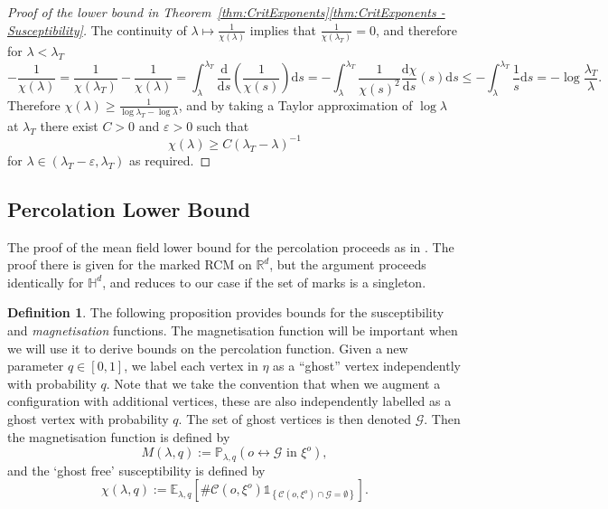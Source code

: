\documentclass[10pt,a4paper,dvipsnames]{article}
\theoremstyle{definition}
\newtheorem{definition}[theorem]{Definition}
\theoremstyle{remark}
\newcommand{\plaq}{\mathbb{P}_{\lambda,q}}
\newcommand{\elaq}{\mathbb E_{\lambda,q}}
\newcommand{\Rd}{\mathbb R^d}
\newcommand{\HypDim}{{\mathbb{H}^d}}
\newcommand{\dd}{\mathrm{d}} %
\newcommand{\C}{\mathscr {C}}
\newcommand{\Gcal}{\mathcal{G}}
\newcommand{\conn}[3]{#1 \longleftrightarrow #2\textrm { in } #3}
\newcommand{\Id}{\mathds 1}
\newcommand{\orig}{o}
\numberwithin{equation}{section}
\begin{document}
\begin{proof}[Proof of the lower bound in Theorem~\ref{thm:CritExponents}\ref{thm:CritExponents - Susceptibility}]
    The continuity of $\lambda\mapsto \frac{1}{\chi\left(\lambda\right)}$ implies that $\frac{1}{\chi\left(\lambda_T\right)}=0$, and therefore for $\lambda<\lambda_T$
    \begin{equation}
        -\frac{1}{\chi\left(\lambda\right)} = \frac{1}{\chi\left(\lambda_T\right)}-\frac{1}{\chi\left(\lambda\right)} = \int^{\lambda_T}_\lambda \frac{\dd}{\dd s}\left(\frac{1}{\chi(s)}\right)\dd s = -\int^{\lambda_T}_\lambda \frac{1}{\chi(s)^2}\frac{\dd \chi}{\dd s}\left(s\right)\dd s \leq -\int^{\lambda_T}_\lambda\frac{1}{s}\dd s = -\log\frac{\lambda_T}{\lambda}.
    \end{equation}
    Therefore $\chi\left(\lambda\right) \geq \frac{1}{\log \lambda_T - \log \lambda}$, and by taking a Taylor approximation of $\log \lambda$ at $\lambda_T$ there exist $C>0$ and $\varepsilon>0$ such that 
    \begin{equation}
        \chi\left(\lambda\right) \geq C\left(\lambda_T-\lambda\right)^{-1}
    \end{equation}
    for $\lambda\in\left(\lambda_T-\varepsilon,\lambda_T\right)$ as required.
\end{proof}

\subsection{Percolation Lower Bound}

The proof of the mean field lower bound for the percolation proceeds as in \cite{caicedo2023critical}. The proof there is given for the marked RCM on $\Rd$, but the argument proceeds identically for $\HypDim$, and reduces to our case if the set of marks is a singleton.

\begin{definition}
The following proposition provides bounds for the susceptibility and \emph{magnetisation} functions. The magnetisation function will be important when we will use it to derive bounds on the percolation function. Given a new parameter $q\in\left[0,1\right]$, we label each vertex in $\eta$ as a ``ghost'' vertex independently with probability $q$. Note that we take the convention that when we augment a configuration with additional vertices, these are also independently labelled as a ghost vertex with probability $q$. The set of ghost vertices is then denoted $\Gcal$. Then the magnetisation function is defined by
\begin{equation}
    M\left(\lambda,q\right) := \plaq\left(\conn{\orig}{\Gcal}{\xi^\orig}\right),
\end{equation}
and the `ghost free' susceptibility is defined by
\begin{equation}
    \chi\left(\lambda,q\right) := \elaq\left[\#\C\left(\orig,\xi^{\orig}\right)\Id_{\left\{\C\left(\orig,\xi^{\orig}\right)\cap \Gcal = \emptyset\right\}}\right].
\end{equation}
\end{definition}
\end{document}
